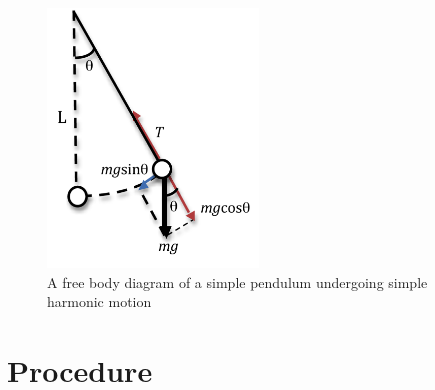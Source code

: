\begin{figure}[h]
\centering
\includegraphics[width=0.5\textwidth]{./Exp1/pic/pendulum.png}
\caption{A free body diagram of a simple pendulum undergoing simple harmonic motion}
\label{fig:pendulum}
\end{figure}

\section{Procedure}


